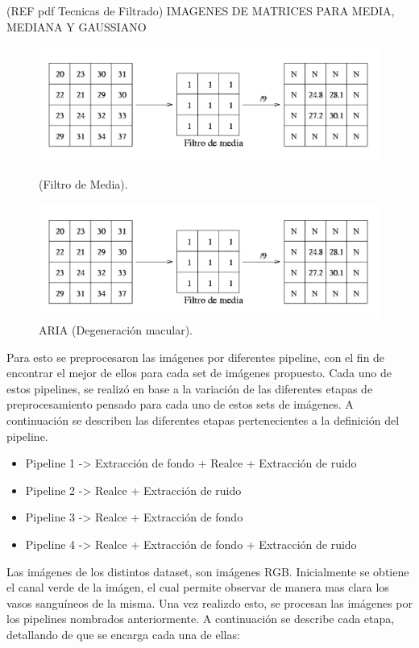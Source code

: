 (REF pdf Tecnicas de Filtrado)
IMAGENES DE MATRICES PARA MEDIA, MEDIANA Y GAUSSIANO
\begin{figure}[h]
	\includegraphics[width=\linewidth]{Figures/media}
	\caption[Filtro de Media]{ (Filtro de Media).}\label{fig:Filtro de Media}
\endminipage\hfill
{}
	\includegraphics[width=\linewidth]{Figures/media}
	\caption[ARIA]{ARIA (Degeneración macular).}\label{fig:ARIA}
\endminipage\hfill
\end{figure}




Para esto se preprocesaron las im\'agenes por diferentes pipeline, con el fin de encontrar el mejor de ellos para cada set de im\'agenes propuesto.
Cada uno de estos pipelines, se realiz\'o en base a la variaci\'on de las diferentes etapas de preprocesamiento pensado para cada uno de estos sets de im\'agenes. A continuaci\'on se describen las diferentes etapas pertenecientes a la definici\'on del pipeline.


\begin{itemize}
	    \item Pipeline 1 -> Extracci\'on de fondo  +  Realce  +  Extracci\'on de ruido
		\item Pipeline 2 -> Realce +  Extracci\'on de ruido
		\item Pipeline 3 -> Realce +  Extracci\'on de fondo
		\item Pipeline 4 -> Realce  + Extracci\'on de fondo   +  Extracci\'on de ruido
\end{itemize}

Las imágenes de los distintos dataset, son imágenes RGB. Inicialmente se obtiene el canal verde de la im\'agen, el cual permite observar de manera mas clara los vasos sangu\'ineos de la misma. Una vez realizdo esto, se procesan las im\'agenes por los pipelines nombrados anteriormente.
A continuaci\'on se describe cada etapa, detallando de que se encarga cada una de ellas:

